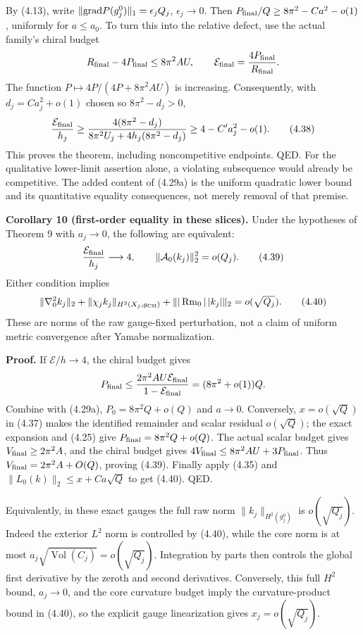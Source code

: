 \documentclass[
  10pt,
]{article}
\begin{document}
By (4.13), write \(\|{\rm grad}P(g_j^0)\|_1=\epsilon_jQ_j\),
\(\epsilon_j\to0\). Then \(P_{\rm final}/Q\ge 8\pi^2-Ca^2-o(1)\),
uniformly for \(a\le a_0\). To turn this into the relative defect, use
the actual family's chiral budget \[
 R_{\rm final}-4P_{\rm final}\le8\pi^2A U,\qquad
 \mathcal E_{\rm final}=\frac{4P_{\rm final}}{R_{\rm final}}.
\] The function \(P\mapsto4P/(4P+8\pi^2AU)\) is increasing.
Consequently, with \(d_j=Ca_j^2+o(1)\) chosen so \(8\pi^2-d_j>0\), \[
 \frac{\mathcal E_{\rm final}}{h_j}
 \ge\frac{4(8\pi^2-d_j)}
             {8\pi^2U_j+4h_j(8\pi^2-d_j)}
 \ge 4-C'a_j^2-o(1). \tag{4.38}
\] This proves the theorem, including noncompetitive endpoints. QED. For
the qualitative lower-limit assertion alone, a violating subsequence
would already be competitive. The added content of (4.29a) is the
uniform quadratic lower bound and its quantitative equality
consequences, not merely removal of that premise.

\textbf{Corollary 10 (first-order equality in these slices).} Under the
hypotheses of Theorem 9 with \(a_j\to0\), the following are equivalent:
\[
 \frac{\mathcal E_{\rm final}}{h_j}\longrightarrow4,
 \qquad \|\mathcal A_0(k_j)\|_2^2=o(Q_j). \tag{4.39}
\] Either condition implies \[
 \|\nabla_0^2k_j\|_2+
 \|\chi_j k_j\|_{H^2(X_j,g_{\rm CH})}
 +\||\operatorname{Rm}_0|\,|k_j|\|_2=o(\sqrt{Q_j}). \tag{4.40}
\] These are norms of the raw gauge-fixed perturbation, not a claim of
uniform metric convergence after Yamabe normalization.

\textbf{Proof.} If \(\mathcal E/h\to4\), the chiral budget gives \[
 P_{\rm final}\le
 \frac{2\pi^2AU\mathcal E_{\rm final}}{1-\mathcal E_{\rm final}}
       =(8\pi^2+o(1))Q.
\] Combine with (4.29a), \(P_0=8\pi^2Q+o(Q)\) and \(a\to0\). Conversely,
\(x=o(\sqrt Q)\) in (4.37) makes the identified remainder and scalar
residual \(o(\sqrt Q)\); the exact expansion and (4.25) give
\(P_{\rm final}=8\pi^2Q+o(Q)\). The actual scalar budget gives
\(V_{\rm final}\ge2\pi^2A\), and the chiral budget gives
\(4V_{\rm final}\le8\pi^2AU+3P_{\rm final}\). Thus
\(V_{\rm final}=2\pi^2A+O(Q)\), proving (4.39). Finally apply (4.35) and
\(\|L_0(k)\|_2\le x+Ca\sqrt Q\) to get (4.40). QED.

Equivalently, in these exact gauges the full raw norm
\(\|k_j\|_{H^2(g_j^0)}\) is \(o(\sqrt{Q_j})\). Indeed the exterior
\(L^2\) norm is controlled by (4.40), while the core norm is at most
\(a_j\sqrt{\operatorname{Vol}(C_j)} =o(\sqrt{Q_j})\). Integration by
parts then controls the global first derivative by the zeroth and second
derivatives. Conversely, this full \(H^2\) bound, \(a_j\to0\), and the
core curvature budget imply the curvature-product bound in (4.40), so
the explicit gauge linearization gives \(x_j=o(\sqrt{Q_j})\).
\end{document}
